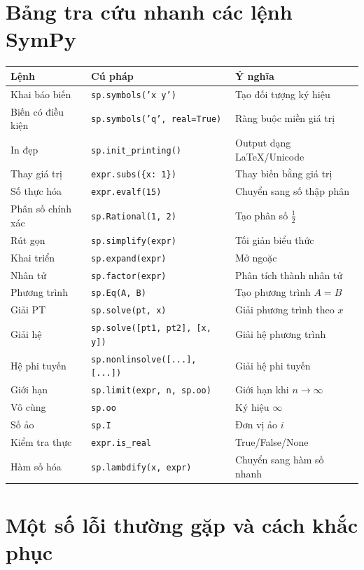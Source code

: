 \documentclass[12pt,a4paper]{report}
\begin{document}
\appendix

\chapter{Bảng tra cứu nhanh các lệnh SymPy}

\begin{longtable}{@{}p{4.2cm}p{4.2cm}p{6cm}@{}}
\toprule
\textbf{Lệnh} & \textbf{Cú pháp} & \textbf{Ý nghĩa}\\
\midrule
\endhead
Khai báo biến & \texttt{sp.symbols('x y')} & Tạo đối tượng ký hiệu\\
Biến có điều kiện & \texttt{sp.symbols('q', real=True)} & Ràng buộc miền giá trị\\
In đẹp & \texttt{sp.init\_printing()} & Output dạng LaTeX/Unicode\\
Thay giá trị & \texttt{expr.subs(\{x: 1\})} & Thay biến bằng giá trị\\
Số thực hóa & \texttt{expr.evalf(15)} & Chuyển sang số thập phân\\
Phân số chính xác & \texttt{sp.Rational(1, 2)} & Tạo phân số $\tfrac12$\\
Rút gọn & \texttt{sp.simplify(expr)} & Tối giản biểu thức\\
Khai triển & \texttt{sp.expand(expr)} & Mở ngoặc\\
Nhân tử & \texttt{sp.factor(expr)} & Phân tích thành nhân tử\\
Phương trình & \texttt{sp.Eq(A, B)} & Tạo phương trình $A = B$\\
Giải PT & \texttt{sp.solve(pt, x)} & Giải phương trình theo $x$\\
Giải hệ & \texttt{sp.solve([pt1, pt2], [x, y])} & Giải hệ phương trình\\
Hệ phi tuyến & \texttt{sp.nonlinsolve([...], [...])} & Giải hệ phi tuyến\\
Giới hạn & \texttt{sp.limit(expr, n, sp.oo)} & Giới hạn khi $n \to \infty$\\
Vô cùng & \texttt{sp.oo} & Ký hiệu $\infty$\\
Số ảo & \texttt{sp.I} & Đơn vị ảo $i$\\
Kiểm tra thực & \texttt{expr.is\_real} & True/False/None\\
Hàm số hóa & \texttt{sp.lambdify(x, expr)} & Chuyển sang hàm số nhanh\\
\bottomrule
\end{longtable}

\chapter{Một số lỗi thường gặp và cách khắc phục}
\end{document}
